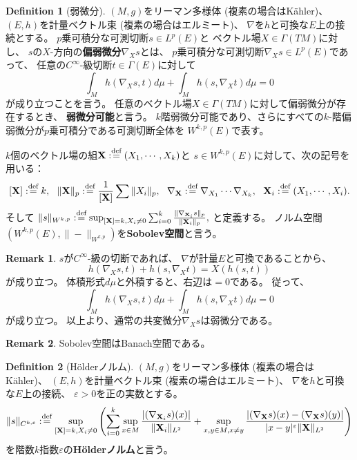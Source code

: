 \documentclass[uplatex]{jsarticle}
\theoremstyle{definition}
\newtheorem{defi}[defi]{Definition}
\newtheorem{rem}[rem]{Remark}
\newcommand{\ep}{\varepsilon}
\newcommand{\dfn}{:\overset{\mbox{{\scriptsize def}}}{=}}
\newcommand{\bfX}{\mathbf{X}}
\begin{document}
\begin{defi}[弱微分]
  \((M,g)\)をリーマン多様体 (複素の場合はK\"{a}hler)、
  \((E,h)\)を計量ベクトル束 (複素の場合はエルミート)、
  \(\nabla\)を\(h\)と可換な\(E\)上の接続とする。
  \(p\)乗可積分な可測切断\(s\in L^p(E)\)と
  ベクトル場\(X\in \Gamma(TM)\)に対し、
  \(s\)の\(X\)-方向の\textbf{偏弱微分}\(\nabla_Xs\)とは、
  \(p\)乗可積分な可測切断\(\nabla_Xs\in L^p(E)\)であって、
  任意の\(C^{\infty}\)-級切断\(t\in \Gamma(E)\)に対して
  \[
  \int_M h(\nabla_Xs,t) d\mu + \int_M h(s,\nabla_Xt) d\mu = 0
  \]
  が成り立つことを言う。
  任意のベクトル場\(X\in \Gamma(TM)\)に対して偏弱微分が存在するとき、
  \textbf{弱微分可能}と言う。
  \(k\)階弱微分可能であり、さらにすべての\(k\)-階偏弱微分が\(p\)乗可積分である可測切断全体を
  \(W^{k,p}(E)\)で表す。

  \(k\)個のベクトル場の組\(\bfX \dfn (X_1,\cdots,X_k)\)と
  \(s\in W^{k,p}(E)\)に対して、次の記号を用いる：
  \[
  [\bfX] \dfn k, \ \
  \|\bfX\|_p \dfn \frac{1}{[\bfX]}\sum \|X_i\|_p, \ \
  \nabla_{\bfX} \dfn \nabla_{X_1}\cdots \nabla_{X_k}, \ \
  \bfX_i \dfn (X_1,\cdots,X_i).
  \]
  そして
  \(
  \|s\|_{W^{k,p}} \dfn \sup_{[\bfX] = k,X_i\neq 0}\sum_{i=0}^k \frac{\|\nabla_{\bfX_i}s\|_p}{\|\bfX_i\|_p},
  \)
  と定義する。
  ノルム空間\((W^{k,p}(E),\|-\|_{W^{k,p}})\)を\textbf{Sobolev空間}と言う。
\end{defi}

\begin{rem}
  \(s\)が\(C^{\infty}\)-級の切断であれば、
  \(\nabla\)が計量\(E\)と可換であることから、
  \[
  h(\nabla_Xs,t) + h(s,\nabla_Xt) = X(h(s,t))
  \]
  が成り立つ。
  体積形式\(d\mu\)と外積すると、右辺は\(=0\)である。
  従って、
  \[
  \int_M h(\nabla_Xs,t) d\mu + \int_M h(s,\nabla_Xt) d\mu = 0
  \]
  が成り立つ。
  以上より、通常の共変微分\(\nabla_Xs\)は弱微分である。
\end{rem}

\begin{rem}
  Sobolev空間はBanach空間である。
\end{rem}





\begin{defi}[H\"{o}lderノルム]
  \((M,g)\)をリーマン多様体 (複素の場合はK\"{a}hler)、
  \((E,h)\)を計量ベクトル束 (複素の場合はエルミート)、
  \(\nabla\)を\(h\)と可換な\(E\)上の接続、
  \(\ep > 0\)を正の実数とする。
  \[
  \|s\|_{C^{k,\ep}} \dfn \sup_{[\bfX] = k, X_i\neq 0}
  \left( \sum_{i=0}^k \sup_{x\in M} \frac{|(\nabla_{\bfX_i}s)(x)|}{\|\bfX_i\|_{L^2}} +
  \sup_{x,y\in M, x\neq y}\frac{|(\nabla_{\bfX}s)(x) - (\nabla_{\bfX}s)(y)|}{|x-y|^{\ep}\|\bfX\|_{L^2}}\right)
  \]
  を階数\(k\)指数\(\ep\)の\textbf{H\"{o}lderノルム}と言う。
\end{defi}
\end{document}
